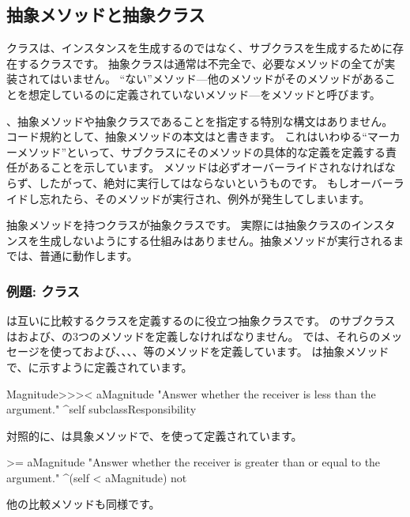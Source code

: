 \documentclass[a4paper,10pt,twoside]{book}
\begin{document}
\subsection{抽象メソッドと抽象クラス}

クラスは、インスタンスを生成するのではなく、サブクラスを生成するために存在するクラスです。
抽象クラスは通常は不完全で、必要なメソッドの全てが実装されてはいません。
``ない''メソッド---他のメソッドがそのメソッドがあることを想定しているのに定義されていないメソッド---をメソッドと呼びます。

、抽象メソッドや抽象クラスであることを指定する特別な構文はありません。
コード規約として、抽象メソッドの本文は\mbox{}と書きます。
これはいわゆる``マーカーメソッド''といって、サブクラスにそのメソッドの具体的な定義を定義する責任があることを示しています。
メソッドは必ずオーバーライドされなければならず、したがって、絶対に実行してはならないというものです。
もしオーバーライドし忘れたら、そのメソッドが実行され、例外が発生してしまいます。

抽象メソッドを持つクラスが抽象クラスです。
実際には抽象クラスのインスタンスを生成しないようにする仕組みはありません。抽象メソッドが実行されるまでは、普通に動作します。

\subsubsection{例題: クラス}
は互いに比較するクラスを定義するのに役立つ抽象クラスです。
のサブクラスは\ct{<}および\ct{=}、の3つのメソッドを定義しなければなりません。
では、それらのメッセージを使って\ct{>}および\ct{>=}、\ct{<=}、、、等のメソッドを定義しています。
は抽象メソッドで、に示すように定義されています。

\begin{method}[MagnitudeLessThan]{}
Magnitude>>>< aMagnitude 
	"Answer whether the receiver is less than the argument."
	^self subclassResponsibility
\end{method}

\noindent
対照的に、は具象メソッドで、\ct{<}を使って定義されています。

\begin{method}[Magnitude>=]{}
>= aMagnitude 
	"Answer whether the receiver is greater than or equal to the argument."
	^(self < aMagnitude) not
\end{method}
他の比較メソッドも同様です。
\end{document}
